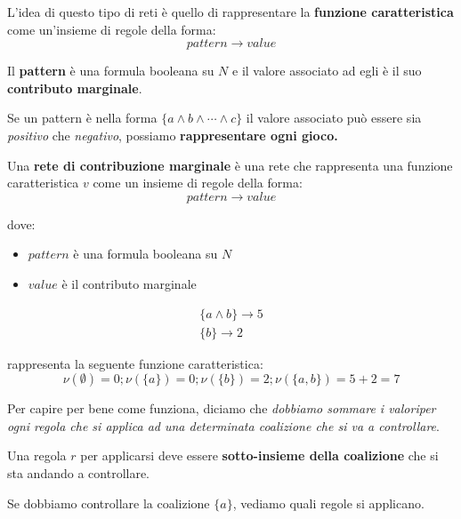 L'idea di questo tipo di reti è quello di rappresentare la \textbf{funzione
    caratteristica} come un'insieme di regole della forma:
\[
    pattern \rightarrow value
\]

Il \textbf{pattern} è una formula booleana su $N$ e il valore associato ad egli
è il suo \textbf{contributo marginale}.

Se un pattern è nella forma $\{a \land b \land \cdots \land c\}$ il valore
associato può essere sia \textit{positivo} che \textit{negativo}, possiamo
\textbf{rappresentare ogni gioco.}

\begin{definition}
    [MC-Nets]
    Una \textbf{rete di contribuzione marginale} è una rete che rappresenta una
    funzione caratteristica $v$ come un insieme di regole della forma:
    \[
        pattern \rightarrow value
    \]

    dove:
    \begin{itemize}
        \item $pattern$ è una formula booleana su $N$
        \item $value$ è il contributo marginale
    \end{itemize}
\end{definition}

\begin{esempio}[MC-Nets]
\end{esempio}

\[
    \begin{aligned}
        \{a \land b\} \rightarrow 5 \\
        \{b\} \rightarrow 2
    \end{aligned}\]

rappresenta la seguente funzione caratteristica:
\[
    \nu(\emptyset) = 0; \nu(\{a\}) = 0; \nu(\{b\}) = 2; \nu(\{a,b\}) = 5 + 2 = 7
\]

Per capire per bene come funziona, diciamo che \textit{dobbiamo sommare i
    valoriper ogni regola che si applica ad una determinata coalizione che si va a
    controllare}.

Una regola $r$ per applicarsi deve essere \textbf{sotto-insieme della
    coalizione} che si sta andando a controllare.

\begin{esempio}

\end{esempio}

Se dobbiamo controllare la coalizione $\{a\}$, vediamo quali regole si
applicano.

